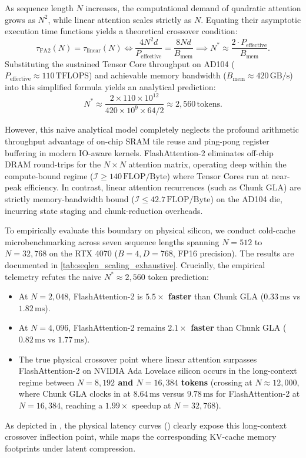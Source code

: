 As sequence length $N$ increases, the computational demand of quadratic attention grows as $N^2$, while linear attention scales strictly as $N$. Equating their asymptotic execution time functions yields a theoretical crossover condition:
\begin{equation}
\label{eq:crossover_math}
\tau_{\text{FA2}}(N) = \tau_{\text{linear}}(N) \iff \frac{4 N^2 d}{P_{\text{effective}}} = \frac{8 N d}{B_{\text{mem}}} \implies N^* \approx \frac{2 \cdot P_{\text{effective}}}{B_{\text{mem}}}.
\end{equation}
Substituting the sustained Tensor Core throughput on AD104 ($P_{\text{effective}} \approx 110\,\text{TFLOPS}$) and achievable memory bandwidth ($B_{\text{mem}} \approx 420\,\text{GB/s}$) into this simplified formula yields an analytical prediction:
\begin{equation}
\label{eq:crossover_analytical_val}
N^* \approx \frac{2 \times 110 \times 10^{12}}{420 \times 10^9 \times 64 / 2} \approx 2{,}560\,\text{tokens}.
\end{equation}

However, this naive analytical model completely neglects the profound arithmetic throughput advantage of on-chip SRAM tile reuse and ping-pong register buffering in modern IO-aware kernels. FlashAttention-2 eliminates off-chip DRAM round-trips for the $N \times N$ attention matrix, operating deep within the compute-bound regime ($\mathcal{I} \ge 140\,\text{FLOP/Byte}$) where Tensor Cores run at near-peak efficiency. In contrast, linear attention recurrences (such as Chunk GLA) are strictly memory-bandwidth bound ($\mathcal{I} \le 42.7\,\text{FLOP/Byte}$) on the AD104 die, incurring state staging and chunk-reduction overheads.

To empirically evaluate this boundary on physical silicon, we conduct cold-cache microbenchmarking across seven sequence lengths spanning $N=512$ to $N=32{,}768$ on the RTX 4070 ($B=4, D=768$, FP16 precision). The results are documented in \cref{tab:seqlen_scaling_exhaustive}. Crucially, the empirical telemetry refutes the naive $N^* \approx 2{,}560$ token prediction:
\begin{itemize}
    \item At $N=2{,}048$, FlashAttention-2 is \textbf{$5.5\times$ faster} than Chunk GLA ($0.33\,\text{ms}$ vs $1.82\,\text{ms}$).
    \item At $N=4{,}096$, FlashAttention-2 remains \textbf{$2.1\times$ faster} than Chunk GLA ($0.82\,\text{ms}$ vs $1.77\,\text{ms}$).
    \item The true physical crossover point where linear attention surpasses FlashAttention-2 on NVIDIA Ada Lovelace silicon occurs in the long-context regime between \textbf{$N=8{,}192$ and $N=16{,}384$ tokens} (crossing at $N \approx 12{,}000$, where Chunk GLA clocks in at $8.64\,\text{ms}$ versus $9.78\,\text{ms}$ for FlashAttention-2 at $N=16{,}384$, reaching a $1.99\times$ speedup at $N=32{,}768$).
\end{itemize}
As depicted in , the physical latency curves () clearly expose this long-context crossover inflection point, while  maps the corresponding KV-cache memory footprints under latent compression.

